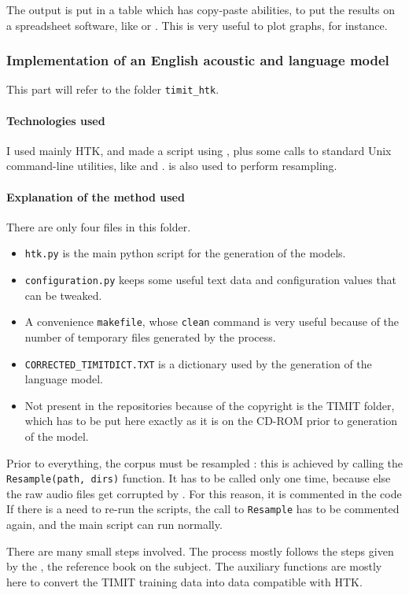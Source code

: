 The output is put in a table which has copy-paste abilities, to put the results on a spreadsheet software, like  or . This is very useful to plot graphs, for instance.
\subsubsection{Implementation of an English acoustic and language model}
This part will refer to the folder \texttt{timit\_htk}. 
\paragraph{Technologies used}
I used mainly \ac{HTK}, and made a script using , plus some calls to standard Unix command-line utilities, like  and .  is also used to perform resampling.
\paragraph{Explanation of the method used}
There are only four files in this folder.
\begin{itemize}
\item \texttt{htk.py} is the main python script for the generation of the models.
\item \texttt{configuration.py} keeps some useful text data and configuration values that can be tweaked.
\item A convenience \texttt{makefile}, whose \texttt{clean} command is very useful because of the number of temporary files generated by the process.
\item \texttt{CORRECTED\_TIMITDICT.TXT} is a dictionary used by the generation of the language model.
\item Not present in the repositories because of the copyright is the \ac{TIMIT} folder, which has to be put here exactly as it is on the CD-ROM prior to generation of the model.
\end{itemize}

Prior to everything, the corpus must be resampled : this is achieved by calling the \texttt{Resample(path, dirs)} function. It has to be called only one time, because else the raw audio files get corrupted by . For this reason, it is commented in the code
If there is a need to re-run the scripts, the call to \texttt{Resample} has to be commented again, and the main script can run normally.

There are many small steps involved. The process mostly follows the steps given by the \cite{htkbook}, the reference book on the subject.
The auxiliary functions are mostly here to convert the \ac{TIMIT} training data into data compatible with \ac{HTK}.

